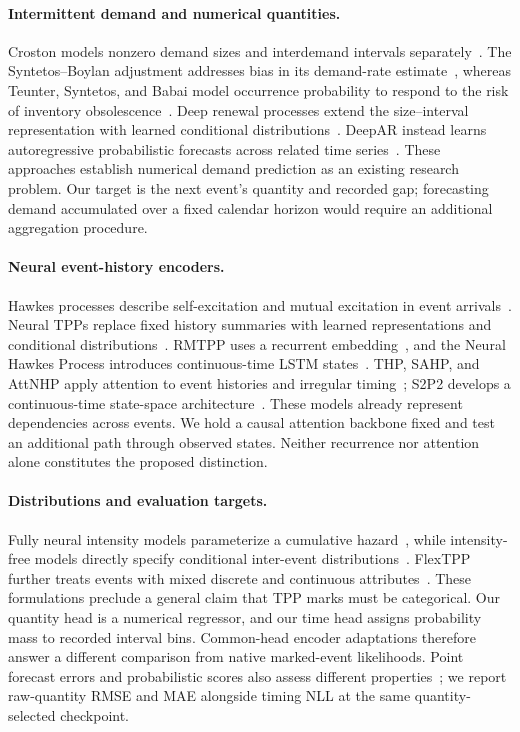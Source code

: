 \documentclass[runningheads]{llncs}
\begin{document}
\paragraph{Intermittent demand and numerical quantities.}
Croston models nonzero demand sizes and interdemand intervals separately~\cite{croston1972forecasting}. The Syntetos--Boylan adjustment addresses bias in its demand-rate estimate~\cite{syntetos2005accuracy}, whereas Teunter, Syntetos, and Babai model occurrence probability to respond to the risk of inventory obsolescence~\cite{teunter2011obsolescence}. Deep renewal processes extend the size--interval representation with learned conditional distributions~\cite{turkmen2021renewal}. DeepAR instead learns autoregressive probabilistic forecasts across related time series~\cite{salinas2020deepar}. These approaches establish numerical demand prediction as an existing research problem. Our target is the next event's quantity and recorded gap; forecasting demand accumulated over a fixed calendar horizon would require an additional aggregation procedure.

\paragraph{Neural event-history encoders.}
Hawkes processes describe self-excitation and mutual excitation in event arrivals~\cite{hawkes1971spectra}. Neural TPPs replace fixed history summaries with learned representations and conditional distributions~\cite{shchur2021review}. RMTPP uses a recurrent embedding~\cite{du2016rmtpp}, and the Neural Hawkes Process introduces continuous-time LSTM states~\cite{mei2017nhp}. THP, SAHP, and AttNHP apply attention to event histories and irregular timing~\cite{zuo2020thp,zhang2020sahp,yang2022anhp}; S2P2 develops a continuous-time state-space architecture~\cite{chang2025s2p2}. These models already represent dependencies across events. We hold a causal attention backbone fixed and test an additional path through observed states. Neither recurrence nor attention alone constitutes the proposed distinction.

\paragraph{Distributions and evaluation targets.}
Fully neural intensity models parameterize a cumulative hazard~\cite{omi2019fully}, while intensity-free models directly specify conditional inter-event distributions~\cite{shchur2020intensityfree}. FlexTPP further treats events with mixed discrete and continuous attributes~\cite{draxler2025flextpp}. These formulations preclude a general claim that TPP marks must be categorical. Our quantity head is a numerical regressor, and our time head assigns probability mass to recorded interval bins. Common-head encoder adaptations therefore answer a different comparison from native marked-event likelihoods. Point forecast errors and probabilistic scores also assess different properties~\cite{hyndman2006accuracy,gneiting2007proper}; we report raw-quantity RMSE and MAE alongside timing NLL at the same quantity-selected checkpoint.
\end{document}
